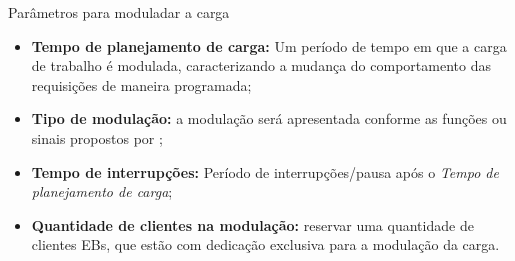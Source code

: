 \begin{frame}{Parâmetros para moduladar a carga}
	\begin{itemize}
		\item \textbf{Tempo de planejamento de carga:} Um período de tempo em que a carga de trabalho é modulada, caracterizando a mudança do comportamento das requisições de maneira programada;
		
		\item \textbf{Tipo de modulação:} a modulação será apresentada conforme as funções ou sinais propostos por \cite{Hellerstein2004};
		
		\item \textbf{Tempo de interrupções:} Período de interrupções/pausa após o \textit{Tempo de planejamento de carga};
		
		\item \textbf{Quantidade de clientes na modulação:} reservar uma quantidade de clientes EBs, que estão com dedicação exclusiva para a modulação da carga.
	\end{itemize}	
\end{frame}

